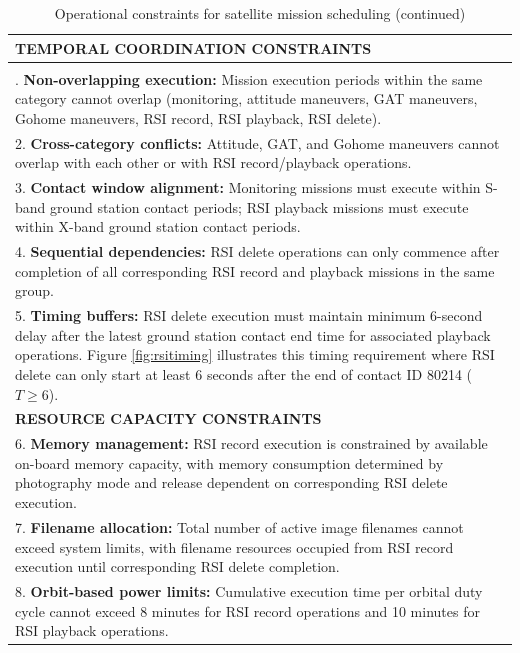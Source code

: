 \documentclass[preprint,3p,12pt,authoryear]{elsarticle}
\begin{document}
\begin{longtable}{|p{}|}
\caption{Operational constraints for satellite mission scheduling organized by constraint category}
\label{tab:constraints} \\
\hline
\textbf{TEMPORAL COORDINATION CONSTRAINTS} \\
\hline
\endfirsthead
\caption[]{Operational constraints for satellite mission scheduling (continued)} \\
\hline
\endhead
\hline
\endfoot
1. \textbf{Non-overlapping execution:} Mission execution periods within the same category cannot overlap (monitoring, attitude maneuvers, GAT maneuvers, Gohome maneuvers, RSI record, RSI playback, RSI delete). \\
2. \textbf{Cross-category conflicts:} Attitude, GAT, and Gohome maneuvers cannot overlap with each other or with RSI record/playback operations. \\
3. \textbf{Contact window alignment:} Monitoring missions must execute within S-band ground station contact periods; RSI playback missions must execute within X-band ground station contact periods. \\
4. \textbf{Sequential dependencies:} RSI delete operations can only commence after completion of all corresponding RSI record and playback missions in the same group. \\
5. \textbf{Timing buffers:} RSI delete execution must maintain minimum 6-second delay after the latest ground station contact end time for associated playback operations. Figure \ref{fig:rsitiming} illustrates this timing requirement where RSI delete can only start at least 6 seconds after the end of contact ID 80214 ($T \geq 6$). \\
\hline
\textbf{RESOURCE CAPACITY CONSTRAINTS} \\
\hline
6. \textbf{Memory management:} RSI record execution is constrained by available on-board memory capacity, with memory consumption determined by photography mode and release dependent on corresponding RSI delete execution. \\
7. \textbf{Filename allocation:} Total number of active image filenames cannot exceed system limits, with filename resources occupied from RSI record execution until corresponding RSI delete completion. \\
8. \textbf{Orbit-based power limits:} Cumulative execution time per orbital duty cycle cannot exceed 8 minutes for RSI record operations and 10 minutes for RSI playback operations. \\

\end{longtable}
\end{document}
